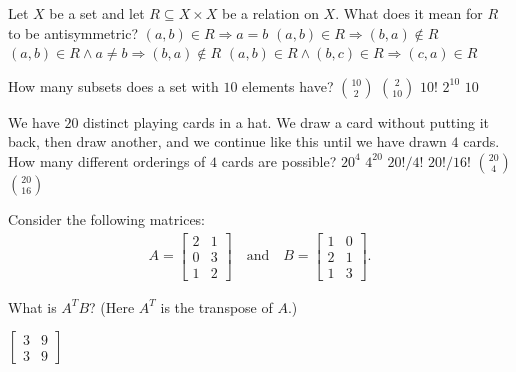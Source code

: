 Let $X$ be a set and let $R \subseteq X \times X$ be a relation on $X$.
What does it mean for $R$ to be antisymmetric?
\oneanswer
\optionsstart
\answer $(a,b)\in R \Rightarrow a=b$
\answer $(a,b)\in R \Rightarrow (b,a)\notin R$
\answer $(a,b) \in R \land a\neq b \Rightarrow (b,a) \notin R$ \correct
\answer $(a,b) \in R \land (b,c) \in R \Rightarrow (c,a) \in R$
\optionsend
{}
\pageshift

How many subsets does a set with $10$ elements have?
\oneanswer
\optionsstart
\answer $\binom{10}{2}$
\answer $\binom{2}{10}$
\answer $10!$
\answer $2^{10}$ \correct
\answer $10$
\optionsend
{}


We have $20$ distinct playing cards in a hat.
We draw a card without putting it back, then draw another, and we continue like this until we have drawn $4$ cards.
How many different orderings of $4$ cards are possible?
\oneanswer
\optionsstart
\answer $20^4$
\answer $4^{20}$
\answer $20!/4!$
\answer $20!/16!$  \correct
\answer $\binom{20}{4}$
\answer $\binom{20}{16}$
\optionsend
{}

Consider the following matrices:
\begin{align*}
    A =
\begin{bmatrix}
2 & 1\\
0 & 3\\
1 & 2
\end{bmatrix}
\quad \text{and} \quad
B =
\begin{bmatrix}
1 & 0\\
2 & 1\\
1 & 3
\end{bmatrix}.
\end{align*}

What is \(A^{T}B\)? (Here \(A^{T}\) is the transpose of \(A\).)
\oneanswer
\optionsstart

\answer \(\displaystyle \begin{bmatrix} 3 & 9\\ 3 & 9 \end{bmatrix}\)
\itxanswer{[[3,9],[3,9]]}

